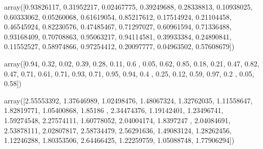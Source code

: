 \documentclass[letterpaper,10pt,english]{jupyterBook}
\begin{document}
\begin{sphinxVerbatim}[commandchars=\\\{\}]
array([0.93826117, 0.31952217, 0.02467775, 0.39249688, 0.28338813,
       0.10938025, 0.60333062, 0.05260068, 0.61619054, 0.85217612,
       0.17514924, 0.21104458, 0.46545924, 0.82230576, 0.47485467,
       0.71297027, 0.60961594, 0.71336488, 0.93168409, 0.70708863,
       0.95063217, 0.94114581, 0.39933384, 0.24890841, 0.11552527,
       0.58974866, 0.97254412, 0.20097777, 0.04963502, 0.57608679])
\end{sphinxVerbatim}

\begin{sphinxVerbatim}[commandchars=\\\{\}]
    
\end{sphinxVerbatim}

\begin{sphinxVerbatim}[commandchars=\\\{\}]
array([0.94, 0.32, 0.02, 0.39, 0.28, 0.11, 0.6 , 0.05, 0.62, 0.85, 0.18,
       0.21, 0.47, 0.82, 0.47, 0.71, 0.61, 0.71, 0.93, 0.71, 0.95, 0.94,
       0.4 , 0.25, 0.12, 0.59, 0.97, 0.2 , 0.05, 0.58])
\end{sphinxVerbatim}

\begin{sphinxVerbatim}[commandchars=\\\{\}]
   
\end{sphinxVerbatim}

\begin{sphinxVerbatim}[commandchars=\\\{\}]
array([2.55553392, 1.37646989, 1.02498476, 1.48067324, 1.32762035,
       1.11558647, 1.82819771, 1.05400868, 1.85186   , 2.34474376,
       1.19142401, 1.23496741, 1.59274548, 2.27574111, 1.60778052,
       2.04004174, 1.8397247 , 2.04084691, 2.53878111, 2.02807817,
       2.58734479, 2.56291636, 1.49083124, 1.28262456, 1.12246288,
       1.80353506, 2.64466425, 1.22259759, 1.05088748, 1.77906294])
\end{sphinxVerbatim}

\begin{sphinxVerbatim}[commandchars=\\\{\}]
   
\end{sphinxVerbatim}
\end{document}
